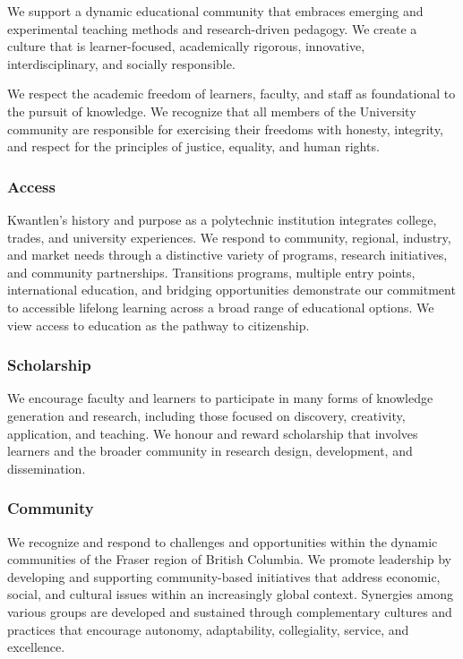 \documentclass[10pt,DIVcalc,oneside,letterpaper,headexclude]{scrreprt}
\begin{document}
\begin{multicols}{2}
We support a dynamic educational community that embraces emerging and experimental teaching methods and research-driven pedagogy. We create a culture that is learner-focused, academically rigorous, innovative, interdisciplinary, and socially responsible.

We respect the academic freedom of learners, faculty, and staff as foundational to the pursuit of knowledge. We recognize that all members of the University community are responsible for exercising their freedoms with  honesty, integrity, and respect for the principles of justice, equality, and human rights.

\subsubsection{\color{Maroon}Access}
Kwantlen's history and purpose as a polytechnic institution integrates college, trades, and university experiences. We respond to community, regional, industry, and market needs through a distinctive variety of programs, research initiatives, and community partnerships. Transitions programs, multiple entry points, international education, and bridging opportunities demonstrate our commitment to accessible lifelong learning across a broad range of educational options. We view access to education as the pathway to citizenship.

\subsubsection{\color{Maroon}Scholarship}
We encourage faculty and learners to participate in many forms of knowledge generation and research, including those focused on discovery, creativity, application, and teaching. We honour and reward scholarship that involves learners and the broader community in research design, development, and dissemination.

\subsubsection{\color{Maroon}Community}
We recognize and respond to challenges and opportunities within the dynamic communities of the Fraser region of British Columbia. We promote leadership by developing and supporting community-based initiatives that address economic, social, and cultural issues within an increasingly global context. Synergies among various groups are developed and sustained through complementary cultures and practices that encourage autonomy, adaptability, collegiality, service, and excellence.


\end{multicols}
\end{document}
